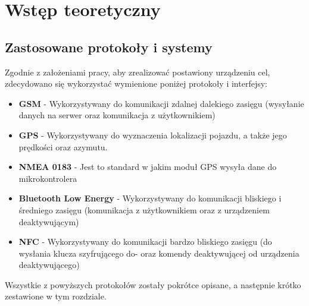 \chapter{Wstęp teoretyczny}
\label{teorethical_introduction}

\section{Zastosowane protokoły i systemy}
Zgodnie z założeniami pracy, aby zrealizować postawiony urządzeniu cel, zdecydowano się wykorzystać wymienione poniżej protokoły i interfejsy:
\begin{itemize}
	\item \textbf{GSM} - Wykorzystywany do komunikacji zdalnej dalekiego zasięgu (wysyłanie danych na serwer oraz komunikacja z użytkownikiem)
	\item \textbf{GPS} - Wykorzystywany do wyznaczenia lokalizacji pojazdu, a także jego prędkości oraz azymutu.
	
	\item \textbf{NMEA 0183} - Jest to standard w jakim moduł GPS wysyła dane do mikrokontrolera
	\item \textbf{Bluetooth Low Energy} - Wykorzystywany do komunikacji bliskiego i średniego zasięgu (komunikacja z użytkownikiem oraz z urządzeniem deaktywującym)
	\item \textbf{NFC} - Wykorzystywany do komunikacji bardzo bliskiego zasięgu (do wysłania klucza szyfrującego do- oraz komendy deaktywującej od urządzenia deaktywującego)
\end{itemize}

Wszystkie z powyższych protokołów zostały pokrótce opisane, a następnie krótko zestawione w tym rozdziale.

\clearpage









